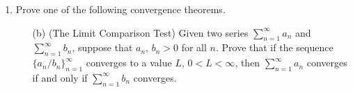 \documentclass[12pt]{amsart}
\begin{document}
\begin{enumerate}
\begin{enumerate}
\begin{proof}
By the Cauchy-Schwarz inequality, we have the following:
%
\[ \left| \sum_{n=1}^N \frac{\sqrt{a_n}}{n} \right|^2 \le \sum_{n=1}^N |a_n| \cdot \sum_{n=1}^N \left|\frac 1 {n^2}\right|. \]
%
Since both $\sum_{n=1}^\infty a_n$ and $\sum_{n=1}^\infty \frac 1 {n^2}$ converge, their partial sums are bounded by some values $M,\, V$ respectively.

Hence, the right side of the Cauchy-Schwarz inequality is bounded by the value $MV$, and the partial sums of $\sum_{n=1}^\infty \frac{\sqrt{a_n}}{n}$ are also bounded.
\end{proof}

%

\end{enumerate}


\item Prove one of the following convergence theorems.

\begin{enumerate}




\item[(b)] (The Limit Comparison Test)  Given two series  $\displaystyle \sum_{n=1}^\infty a_n$ and  $\displaystyle \sum_{n=1}^\infty b_n$, suppose that $a_n,\,b_n >0$ for all $n$.  Prove that if  the sequence $\{a_n/b_n\}_{n=1}^\infty$ converges to a value $L$, $0<L<\infty$, then  $\displaystyle \sum_{n=1}^\infty a_n$ converges if and only if  $\displaystyle \sum_{n=1}^\infty b_n$ converges.



\end{enumerate}
\end{enumerate}
\end{document}
